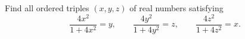 Find all ordered triples $(x,y,z)$ of real numbers satisfying
\[
\dfrac{4x^2}{1+4x^2}=y,\qquad \dfrac{4y^2}{1+4y^2}=z,\qquad \dfrac{4z^2}{1+4z^2}=x .
\]
